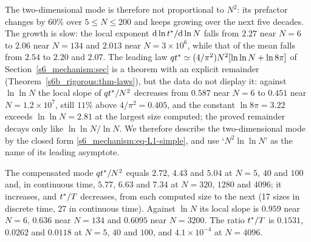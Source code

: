 The two-dimensional mode is therefore not proportional to $N^{2}$: its prefactor changes by $60\%$ over
$5\le N\le200$ and keeps growing over the next five decades. The growth is slow: the local exponent
$\mathrm{d}\ln t^{*}/\mathrm{d}\ln N$ falls from $2.27$ near $N=6$ to $2.06$ near $N=134$ and $2.013$ near $N=3\times10^{6}$, while
that of the mean falls from $2.54$ to $2.20$ and $2.07$.
The leading law $qt^{*}\simeq(4/\pi^{2})N^{2}[\ln\ln N+\ln8\pi]$ of Section~\ref{s6_mechanism:sec} is a theorem with an
explicit remainder (Theorem~\ref{s6b_rigorous:thm-laws}), but the data do not display it: against $\ln\ln N$ the local
slope of $qt^{*}/N^{2}$ decreases from $0.587$ near $N=6$ to $0.451$ near $N=1.2\times10^{7}$, still $11\%$ above
$4/\pi^{2}=0.405$, and the constant $\ln8\pi=3.22$ exceeds $\ln\ln N=2.81$ at the largest size computed; the proved
remainder decays only like $\ln\ln N/\ln N$. We therefore describe the two-dimensional mode by the closed form
\eqref{s6_mechanism:eq-L1-simple}, and use `$N^{2}\ln\ln N$' as the name of its leading asymptote.

\begin{observation}\label{s5_modes:obs-3d}
The compensated mode $qt^{*}/N^{2}$ equals $2.72$, $4.43$ and $5.04$ at $N=5$, $40$ and $100$ and, in continuous
time, $5.77$, $6.63$ and $7.34$ at $N=320$, $1280$ and $4096$; it increases, and $t^{*}/T$ decreases, from each
computed size to the next (17 sizes in discrete time, 27 in continuous time). Against $\ln N$ its local slope is
$0.959$ near $N=6$, $0.636$ near $N=134$ and $0.6095$ near $N=3200$. The ratio $t^{*}/T$ is $0.1531$, $0.0262$
and $0.0118$ at $N=5$, $40$ and $100$, and $4.1\times10^{-4}$ at $N=4096$.
\end{observation}

